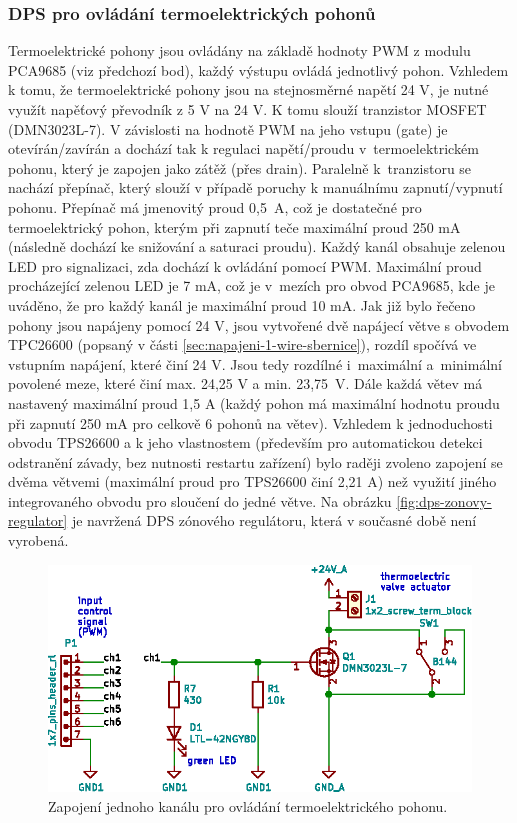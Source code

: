\subsubsection{DPS pro ovládání termoelektrických pohonů}
Termoelektrické pohony jsou ovládány na základě hodnoty PWM z modulu PCA9685 (viz předchozí bod), každý výstupu ovládá jednotlivý pohon. Vzhledem k tomu, že termoelektrické pohony jsou na stejnosměrné napětí 24 V, je nutné využít napěťový převodník z 5 V na 24 V. K tomu slouží tranzistor MOSFET (DMN3023L-7). V závislosti na hodnotě PWM na jeho vstupu (gate) je otevírán/zavírán a dochází tak k regulaci napětí/proudu v~termoelektrickém pohonu, který je zapojen jako zátěž (přes drain). Paralelně k~tranzistoru se nachází přepínač, který slouží v případě poruchy k manuálnímu zapnutí/vypnutí pohonu. Přepínač má jmenovitý proud 0,5~A, což je dostatečné pro termoelektrický pohon, kterým při zapnutí teče maximální proud 250 mA (následně dochází ke snižování a saturaci proudu). Každý kanál obsahuje zelenou LED pro signalizaci, zda dochází k ovládání pomocí PWM. Maximální proud procházející zelenou LED je 7 mA, což je v~mezích pro obvod PCA9685, kde je uváděno, že pro každý kanál je maximální proud 10 mA. Jak již bylo řečeno pohony jsou napájeny pomocí 24 V, jsou vytvořené dvě napájecí větve s obvodem TPC26600 (popsaný v části \ref{sec:napajeni-1-wire-sbernice}), rozdíl spočívá ve vstupním napájení, které činí 24 V. Jsou tedy rozdílné i~maximální a~minimální povolené meze, které činí max. 24,25 V a min. 23,75~V. Dále každá větev má nastavený maximální proud 1,5 A (každý pohon má maximální hodnotu proudu při zapnutí 250 mA pro celkově 6 pohonů na větev). Vzhledem k jednoduchosti obvodu TPS26600 a k jeho vlastnostem (především pro automatickou detekci odstranění závady, bez nutnosti restartu zařízení) bylo raději zvoleno zapojení se dvěma větvemi (maximální proud pro TPS26600 činí 2,21 A) než využití jiného integrovaného obvodu pro sloučení do jedné větve. Na obrázku \ref{fig:dps-zonovy-regulator} je navržená DPS zónového regulátoru, která v současné době není vyrobená.


\begin{figure}[H]
    \centering
    \includegraphics[width=\textwidth]{images/svg/kicad/zonovy-regulator-mosfet-pwm.eps}
    \caption[Zapojení jednoho kanálu pro ovládání termoelektrického pohonu.]{Zapojení jednoho kanálu pro ovládání termoelektrického pohonu.}
    \label{fig:zonovy-regulator-mosfet-pwm}
\end{figure}


